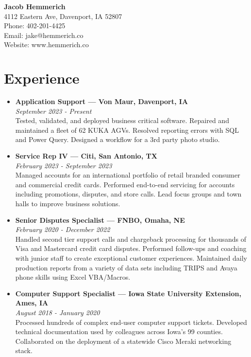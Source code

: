 \documentclass[letterpaper,9pt]{article}
\begin{document}

\begin{center}
\textbf{\Large Jacob Hemmerich} \\
4112 Eastern Ave, Davenport, IA 52807 \\
Phone: 402-201-4425 \\
Email: jake@hemmerich.co \\
Website: www.hemmerich.co
\end{center}

\section*{Experience}
\begin{itemize}
\item[] \textbf{Application Support — Von Maur, Davenport, IA} \\
\textit{September 2023 - Present} \\
Tested, validated, and deployed business critical software. Repaired and maintained a fleet of 62 KUKA AGVs. Resolved reporting errors with SQL and Power Query. Designed a workflow for a 3rd party photo studio.

\item[] \textbf{Service Rep IV — Citi, San Antonio, TX} \\
\textit{February 2023 - September 2023} \\
Managed accounts for an international portfolio of retail branded consumer and commercial credit cards. Performed end-to-end servicing for accounts including promotions, disputes, and store calls. Lead focus groups and town halls to improve business solutions.

\item[] \textbf{Senior Disputes Specialist — FNBO, Omaha, NE} \\
\textit{February 2020 - December 2022} \\
Handled second tier support calls and chargeback processing for thousands of Visa and Mastercard credit card disputes. Performed follow-ups and coaching with junior staff to create exceptional customer experiences. Maintained daily production reports from a variety of data sets including TRIPS and Avaya phone skills using Excel VBA/Macros.

\item[] \textbf{Computer Support Specialist — Iowa State University Extension, Ames, IA} \\
\textit{August 2018 - January 2020} \\
Processed hundreds of complex end-user computer support tickets. Developed technical documentation used by colleagues across Iowa’s 99 counties. Collaborated on the deployment of a statewide Cisco Meraki networking stack.
\end{itemize}
\end{document}
